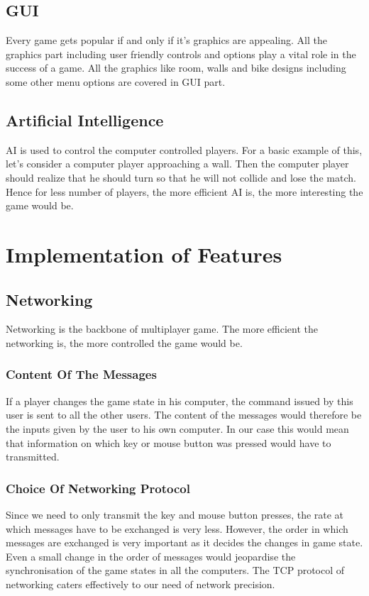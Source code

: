 \documentclass[14 pt]{article}
\begin{document}
\subsection{GUI}
    Every game gets popular if and only if it's graphics are appealing. All the graphics part including user friendly controls and options play a vital role in the success of a game. All the graphics like room, walls and bike designs including some other menu options are covered in GUI part.\\
    
\subsection{Artificial Intelligence}
    AI is used to control the computer controlled players. For a basic example of this, let's consider a computer player approaching a wall. Then the computer player should realize that he should turn so that he will not collide and lose the match. Hence for less number of players, the more efficient AI is, the more interesting the game would be.\\

\section{Implementation of Features}
\subsection{Networking}
    Networking is the backbone of multiplayer game. The more efficient the networking is, the more controlled the game would be.\\

\subsubsection{Content Of The Messages}
    If a player changes the game state in his computer, the command issued by this user is sent to all the other users. The content of the messages would therefore be the inputs given by the user to his own computer. In our case this would mean that information on which key or mouse button was pressed would have to transmitted.\\

\subsubsection{Choice Of Networking Protocol}
    Since we need to only transmit the key and mouse button presses, the rate at which messages have to be exchanged is very less. However, the order in which messages are exchanged is very important as it decides the changes in game state. Even a small change in the order of messages would jeopardise the synchronisation of the game states in all the computers. The TCP protocol of networking caters effectively to our need of network precision.\\
\end{document}

